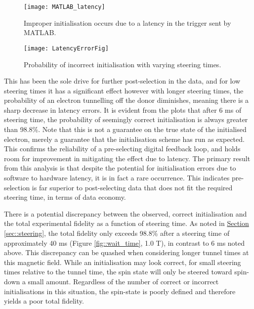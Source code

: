 	\begin{figure}[htbp!]
		\centering
		\texttt{[image: MATLAB\_latency]}
		\caption{Improper initialisation occurs due to a latency in the trigger sent by MATLAB.}
		\label{fig::latency}
	\end{figure}
	
	\begin{figure}[htb!]
		\centering
		\texttt{[image: LatencyErrorFig]}
		\caption{Probability of incorrect initialisation with varying steering times.}
		\label{fig::latency_errors}
	\end{figure}
	
	This has been the sole drive for further post-selection in the data, and for low steering times it has a significant effect however with longer steering times, the probability of an electron tunnelling off the donor diminishes, meaning there is a sharp decrease in latency errors. It is evident from the plots that after 6 ms of steering time, the probability of seemingly correct initialisation  is always greater than 98.8\%. Note that this is not a guarantee on the true state of the initialised electron, merely a guarantee that the initialisation scheme has run as expected. This confirms the reliability of a pre-selecting digital feedback loop, and holds room for improvement in mitigating the effect due to latency. The primary result from this analysis is that despite the potential for initialisation errors due to software to hardware latency, it is in fact a rare occurrence. This indicates pre-selection is far superior to post-selecting data that does not fit the required steering time, in terms of data economy. 
	
	There is a potential discrepancy between the observed, correct initialisation and the total experimental fidelity as a function of steering time. As noted in \hyperref[sec::steering]{Section \ref{sec::steering}}, the total fidelity only exceeds 98.8\% after a steering time of approximately 40 ms (Figure \ref{fig::wait_time}, 1.0 T), in contrast to 6 ms noted above. This discrepancy can be quashed when considering longer tunnel times at this magnetic field. While an initialisation may look correct, for small steering times relative to the tunnel time, the spin state will only be steered toward spin-down a small amount. Regardless of the number of correct or incorrect initialisations in this situation, the spin-state is poorly defined and therefore yields a poor total fidelity.
	